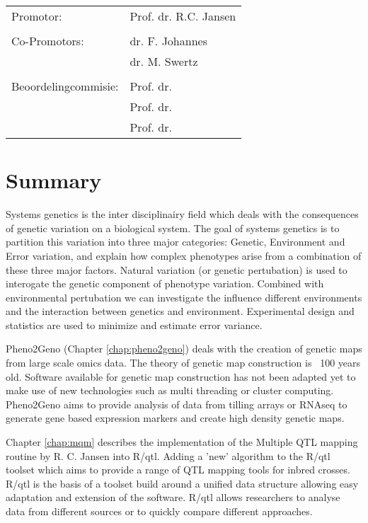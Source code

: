 \documentclass[8pt, twoside]{book}
\begin{document}
\newpage
\thispagestyle{empty}
\begin{tabular}{ l l }
Promotor:             & Prof. dr. R.C. Jansen \\
                      & \\
Co-Promotors:         & dr. F. Johannes \\
                      & dr. M. Swertz \\
                      & \\
Beoordelingcommisie:  & Prof. dr. \\
                      & Prof. dr. \\
                      & Prof. dr. \\
\end{tabular}
\tableofcontents

\newpage
\thispagestyle{empty}
\chapter*{Summary}\vspace{-30pt}
Systems genetics is the inter disciplinairy field which deals with the consequences of genetic 
variation on a biological system. The goal of systems genetics is to partition this variation 
into three major categories: Genetic, Environment and Error variation, and explain how complex
phenotypes arise from a combination of these three major factors.  Natural variation (or 
genetic pertubation) is used to interogate the genetic component of phenotype variation. 
Combined with environmental pertubation we can investigate the influence different 
environments and the interaction between genetics and environment. Experimental design and 
statistics are used to minimize and estimate error variance.

Pheno2Geno (Chapter \ref{chap:pheno2geno}) deals with the creation of genetic maps from large scale omics data. 
The theory of genetic map construction is ~100 years old. Software available for genetic map 
construction has not been adapted yet to make use of new technologies such as multi threading 
or cluster computing. Pheno2Geno aims to provide analysis of data from tilling arrays or RNAseq 
to generate gene based expression markers and create high density genetic maps.

Chapter \ref{chap:mqm} describes the implementation of the Multiple QTL mapping routine 
by R. C. Jansen into R/qtl. Adding a 'new' algorithm to the R/qtl toolset which aims to 
provide a range of QTL mapping tools for inbred crosses. R/qtl is the basis of a toolset 
build around a unified data structure allowing easy adaptation and extension of the software. 
R/qtl allows researchers to analyse data from different sources or to quickly compare 
different approaches.
\end{document}

